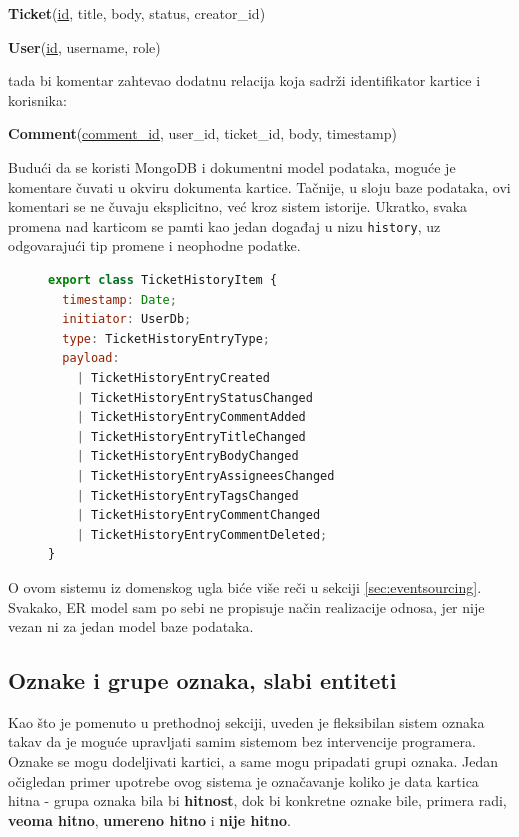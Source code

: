 \documentclass[12pt,oneside]{memoir}
\begin{document}
\begin{center}
\textbf{Ticket}(\underline{id}, title, body, status, creator\_id)    
\end{center}

\begin{center}
\textbf{User}(\underline{id}, username, role)    
\end{center}

tada bi komentar zahtevao dodatnu relacija koja sadrži identifikator kartice i korisnika:

\begin{center}
\textbf{Comment}(\underline{comment\_id}, user\_id, ticket\_id, body, timestamp)    
\end{center}

Budući da se koristi MongoDB i dokumentni model podataka, moguće je komentare čuvati u okviru dokumenta kartice. Tačnije, u sloju baze podataka, ovi komentari se ne čuvaju eksplicitno, već kroz sistem istorije. Ukratko, svaka promena nad karticom se pamti kao jedan događaj u nizu \verb|history|, uz odgovarajući tip promene i neophodne podatke.

\begin{figure}[h]
\begin{lstlisting}[language=JavaScript, style=ES6, caption={Tip podataka istorije kartice.}]
export class TicketHistoryItem {
  timestamp: Date;
  initiator: UserDb;
  type: TicketHistoryEntryType;
  payload:
    | TicketHistoryEntryCreated
    | TicketHistoryEntryStatusChanged
    | TicketHistoryEntryCommentAdded
    | TicketHistoryEntryTitleChanged
    | TicketHistoryEntryBodyChanged
    | TicketHistoryEntryAssigneesChanged
    | TicketHistoryEntryTagsChanged
    | TicketHistoryEntryCommentChanged
    | TicketHistoryEntryCommentDeleted;
}
\end{lstlisting}
\end{figure}

O ovom sistemu iz domenskog ugla biće više reči u sekciji \ref{sec:eventsourcing}. Svakako, ER model sam po sebi ne propisuje način realizacije odnosa, jer nije vezan ni za jedan model baze podataka.

\subsection{Oznake i grupe oznaka, slabi entiteti}

Kao što je pomenuto u prethodnoj sekciji, uveden je fleksibilan sistem oznaka takav da je moguće upravljati samim sistemom bez intervencije programera. Oznake se mogu dodeljivati kartici, a same mogu pripadati grupi oznaka. Jedan očigledan primer upotrebe ovog sistema je označavanje koliko je data kartica hitna - grupa oznaka bila bi \textbf{hitnost}, dok bi konkretne oznake bile, primera radi, \textbf{veoma hitno}, \textbf{umereno hitno} i \textbf{nije hitno}.
\end{document}
